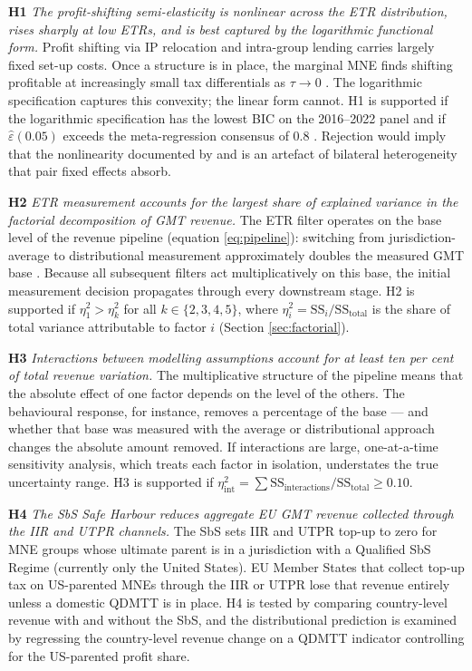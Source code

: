 \documentclass[11pt,a4paper]{article}
\begin{document}
\textbf{H1} \emph{The profit-shifting semi-elasticity is nonlinear across the ETR distribution, rises sharply at low ETRs, and is best captured by the logarithmic functional form.} Profit shifting via IP relocation and intra-group lending carries largely fixed set-up costs. Once a structure is in place, the marginal MNE finds shifting profitable at increasingly small tax differentials as $\tau \to 0$ \citep{bilicka2023}. The logarithmic specification captures this convexity; the linear form cannot. H1 is supported if the logarithmic specification has the lowest BIC on the 2016--2022 panel and if $\hat{\varepsilon}(0.05)$ exceeds the meta-regression consensus of 0.8 \citep{heckemeyer2017}. Rejection would imply that the nonlinearity documented by \citet{dowd2017} and \citet{garcia-bernardo2024} is an artefact of bilateral heterogeneity that pair fixed effects absorb.

\textbf{H2} \emph{ETR measurement accounts for the largest share of explained variance in the factorial decomposition of GMT revenue.} The ETR filter operates on the base level of the revenue pipeline (equation \ref{eq:pipeline}): switching from jurisdiction-average to distributional measurement approximately doubles the measured GMT base \citep{hugger2026}. Because all subsequent filters act multiplicatively on this base, the initial measurement decision propagates through every downstream stage. H2 is supported if $\eta_1^2 > \eta_k^2$ for all $k \in \{2,3,4,5\}$, where $\eta_i^2 = \text{SS}_i / \text{SS}_{\text{total}}$ is the share of total variance attributable to factor $i$ (Section \ref{sec:factorial}).

\textbf{H3} \emph{Interactions between modelling assumptions account for at least ten per cent of total revenue variation.} The multiplicative structure of the pipeline means that the absolute effect of one factor depends on the level of the others. The behavioural response, for instance, removes a percentage of the base --- and whether that base was measured with the average or distributional approach changes the absolute amount removed. If interactions are large, one-at-a-time sensitivity analysis, which treats each factor in isolation, understates the true uncertainty range. H3 is supported if $\eta_{\text{int}}^2 = \sum \text{SS}_{\text{interactions}}/\text{SS}_{\text{total}} \ge 0.10$.

\textbf{H4} \emph{The SbS Safe Harbour reduces aggregate EU GMT revenue collected through the IIR and UTPR channels.} The SbS sets IIR and UTPR top-up to zero for MNE groups whose ultimate parent is in a jurisdiction with a Qualified SbS Regime (currently only the United States). EU Member States that collect top-up tax on US-parented MNEs through the IIR or UTPR lose that revenue entirely unless a domestic QDMTT is in place. H4 is tested by comparing country-level revenue with and without the SbS, and the distributional prediction is examined by regressing the country-level revenue change on a QDMTT indicator controlling for the US-parented profit share.
\end{document}
